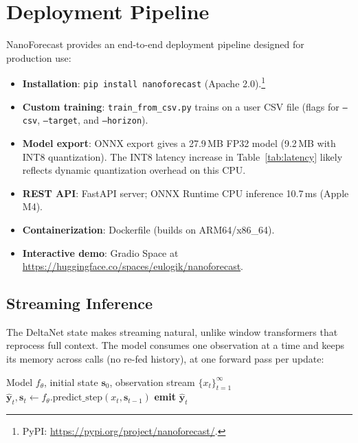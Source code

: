 \documentclass[11pt]{article}
\begin{document}
\section{Deployment Pipeline}
\label{sec:deployment}

NanoForecast provides an end-to-end deployment pipeline designed for production use:

\begin{itemize}
\item \textbf{Installation}: \texttt{pip install nanoforecast} (Apache 2.0).\footnote{PyPI: \url{https://pypi.org/project/nanoforecast/}.}
\item \textbf{Custom training}: \texttt{train\_from\_csv.py} trains on a user CSV file (flags for \texttt{--csv}, \texttt{--target}, and \texttt{--horizon}).
\item \textbf{Model export}: ONNX export gives a 27.9\,MB FP32 model (9.2\,MB with INT8 quantization). The INT8 latency increase in Table~\ref{tab:latency} likely reflects dynamic quantization overhead on this CPU.
\item \textbf{REST API}: FastAPI server; ONNX Runtime CPU inference 10.7\,ms (Apple M4).
\item \textbf{Containerization}: Dockerfile (builds on ARM64/x86\_64).
\item \textbf{Interactive demo}: Gradio Space at \url{https://huggingface.co/spaces/eulogik/nanoforecast}.
\end{itemize}

\subsection{Streaming Inference}

The DeltaNet state makes streaming natural, unlike window transformers that reprocess full context. The model consumes one observation at a time and keeps its memory across calls (no re-fed history), at one forward pass per update:

\begin{algorithm}[h]
\caption{Streaming inference loop.}
\label{alg:streaming}
\begin{algorithmic}[1]
\Require Model $f_\theta$, initial state $\mathbf{s}_0$, observation stream $\{x_t\}_{t=1}^\infty$
    \State $\hat{\mathbf{y}}_t, \mathbf{s}_t \gets f_\theta.\text{predict\_step}(x_t, \mathbf{s}_{t-1})$
    \State \textbf{emit} $\hat{\mathbf{y}}_t$
\EndFor
\end{algorithmic}
\end{algorithm}
\end{document}
